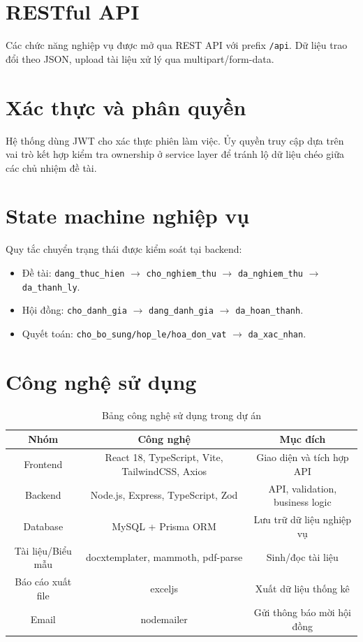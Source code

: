\documentclass[12pt,a4paper]{report}
\begin{document}
\section{RESTful API}
Các chức năng nghiệp vụ được mở qua REST API với prefix \texttt{/api}. Dữ liệu trao đổi theo JSON, upload tài liệu xử lý qua multipart/form-data.

\section{Xác thực và phân quyền}
Hệ thống dùng JWT cho xác thực phiên làm việc. Ủy quyền truy cập dựa trên vai trò kết hợp kiểm tra ownership ở service layer để tránh lộ dữ liệu chéo giữa các chủ nhiệm đề tài.

\section{State machine nghiệp vụ}
Quy tắc chuyển trạng thái được kiểm soát tại backend:
\begin{itemize}[leftmargin=1.2cm]
\item Đề tài: \texttt{dang\_thuc\_hien} $\rightarrow$ \texttt{cho\_nghiem\_thu} $\rightarrow$ \texttt{da\_nghiem\_thu} $\rightarrow$ \texttt{da\_thanh\_ly}.
\item Hội đồng: \texttt{cho\_danh\_gia} $\rightarrow$ \texttt{dang\_danh\_gia} $\rightarrow$ \texttt{da\_hoan\_thanh}.
\item Quyết toán: \texttt{cho\_bo\_sung/hop\_le/hoa\_don\_vat} $\rightarrow$ \texttt{da\_xac\_nhan}.
\end{itemize}

\section{Công nghệ sử dụng}
\begin{table}[H]
\centering
\begin{tabular}{|c|c|c|}
\hline
\textbf{Nhóm} & \textbf{Công nghệ} & \textbf{Mục đích} \\ \hline
Frontend & React 18, TypeScript, Vite, TailwindCSS, Axios & Giao diện và tích hợp API \\ \hline
Backend & Node.js, Express, TypeScript, Zod & API, validation, business logic \\ \hline
Database & MySQL + Prisma ORM & Lưu trữ dữ liệu nghiệp vụ \\ \hline
Tài liệu/Biểu mẫu & docxtemplater, mammoth, pdf-parse & Sinh/đọc tài liệu \\ \hline
Báo cáo xuất file & exceljs & Xuất dữ liệu thống kê \\ \hline
Email & nodemailer & Gửi thông báo mời hội đồng \\ \hline
\end{tabular}
\caption{Bảng công nghệ sử dụng trong dự án}
\end{table}
\end{document}
